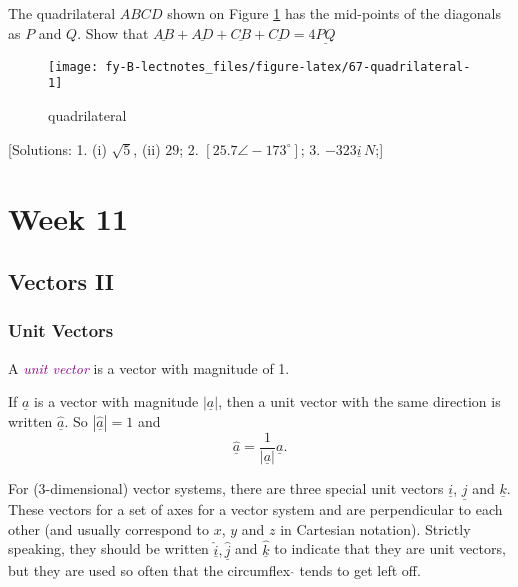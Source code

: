 \documentclass[
  english,
  11pt,
  oneside]{book}
\newcommand{\slide}{}
\theoremstyle{definition}
\theoremstyle{definition}
\theoremstyle{definition}
\theoremstyle{definition}
\theoremstyle{remark}
\begin{document}
The quadrilateral \(ABCD\) shown on Figure \ref{fig:67-quadrilateral} has the mid-points of the diagonals as \(P\) and \(Q\). Show that \(\underline{AB}+\underline{AD}+\underline{CB}+\underline{CD} = 4\underline{PQ}\)

\begin{figure}

{\centering \texttt{[image: fy-B-lectnotes\_files/figure-latex/67-quadrilateral-1]} 

}

\caption{quadrilateral}\label{fig:67-quadrilateral}
\end{figure}

{[}Solutions:
1. (i) \(\sqrt{5}\), (ii) \(29\);
2. \([25.7 \angle -173^{\circ}]\);
3. \(-323\underline{i}\,N\);{]}

\slide

\chapter{Week 11}\label{week-eleven}

\slide

\section{Vectors II}\label{vectors-ii}

\subsection{Unit Vectors}\label{unit-vectors}

A \textcolor{purple}{\em unit vector} is a vector with magnitude of 1.

If \(\underline a\) is a vector with magnitude \(|\underline a|\), then a unit vector with the same direction is written \(\hat{\underline a}\). So \(|\hat{\underline a}| = 1\) and
\[
\hat{\underline a} = \frac1{|\underline a|}{\underline a}.
\]

\slide

For (3-dimensional) vector systems, there are three special unit vectors \(\underline i\), \(\underline j\) and \(\underline k\).
These vectors for a set of axes for a vector system and are perpendicular to each other (and usually correspond to \(x\), \(y\) and \(z\) in Cartesian notation).
Strictly speaking, they should be written \(\hat{\underline i}, \hat{\underline j}\) and \(\hat{\underline k}\) to indicate that they are unit vectors, but they are used so often that the circumflex \(\hat{}\) tends to get left off.
\end{document}
